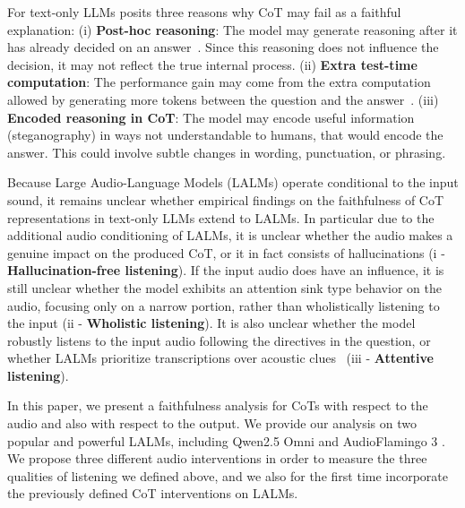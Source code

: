 \documentclass{Interspeech}
\begin{document}
For text-only LLMs \cite{lanham2023measuringfaithfulnesschainofthoughtreasoning} posits three reasons why CoT may fail as a faithful explanation:  
(i) \textbf{Post-hoc reasoning}: The model may generate reasoning after it has already decided on an answer~\cite{holzinger2017needbuildexplainableai}. Since this reasoning does not influence the decision, it may not reflect the true internal process.  
(ii) \textbf{Extra test-time computation}: The performance gain may come from the extra computation allowed by generating more tokens between the question and the answer~\cite{wei2023chainofthoughtpromptingelicitsreasoning}.  
(iii) \textbf{Encoded reasoning in CoT}: The model may encode useful information (steganography) in ways not understandable to humans, that would encode the answer. This could involve subtle changes in wording, punctuation, or phrasing.


Because Large Audio-Language Models (LALMs) operate conditional to the input sound, it remains unclear whether empirical findings on the faithfulness of CoT representations in text-only LLMs extend to LALMs. In particular due to the additional audio conditioning of LALMs, it is unclear whether the audio makes a genuine impact on the produced CoT, or it in fact consists of hallucinations (i - \textbf{Hallucination-free listening}). If the input audio does have an influence, it is still unclear whether the model exhibits an attention sink type \cite{wang2025mirageeyeshallucinationattack, xiao2024efficientstreaminglanguagemodels, huang2024operaalleviatinghallucinationmultimodal} behavior on the audio, focusing only on a narrow portion, rather than wholistically listening to the input (ii - \textbf{Wholistic listening}). It is also unclear whether the model robustly listens to the input audio following the directives in the question, or whether LALMs prioritize transcriptions over acoustic clues~\cite{chen2025audio} (iii - \textbf{Attentive listening}). 


In this paper, we present a faithfulness analysis for CoTs with respect to the audio and also with respect to the output. We provide our analysis on two popular and powerful LALMs, including Qwen2.5 Omni \cite{Qwen2.5-Omni} and AudioFlamingo 3 \cite{goel2025audioflamingo3advancing}. We propose three different audio interventions in order to measure the three qualities of listening we defined above, and we also for the first time incorporate the previously defined CoT interventions on LALMs. 
\end{document}
